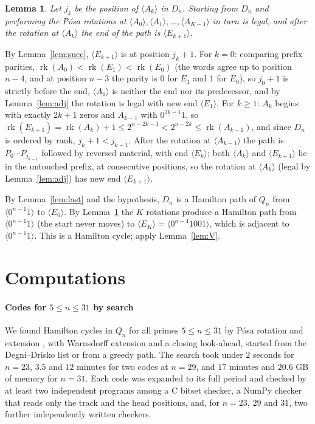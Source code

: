 \documentclass[journal,onecolumn,11pt]{IEEEtran}
\newtheorem{lemma}{Lemma}
\newcommand{\rk}{\operatorname{rk}}
\begin{document}
\begin{lemma}\label{lem:legal}
Let $j_k$ be the position of $\langle A_k\rangle$ in $D_n$. Starting from $D_n$ and performing the P\'osa rotations at
$\langle A_0\rangle,\langle A_1\rangle,\dots,\langle A_{K-1}\rangle$ in turn is legal, and after the rotation at
$\langle A_k\rangle$ the end of the path is $\langle E_{k+1}\rangle$.
\end{lemma}
\begin{IEEEproof}
By Lemma~\ref{lem:succ}, $\langle E_{k+1}\rangle$ is at position $j_k+1$. For $k=0$: comparing prefix parities,
$\rk(A_0)<\rk(E_1)<\rk(E_0)$ (the words agree up to position $n-4$, and at position $n-3$ the parity is $0$ for
$E_1$ and $1$ for $E_0$), so $j_0+1$ is strictly before the end, $\langle A_0\rangle$ is neither the end nor its
predecessor, and by Lemma~\ref{lem:adj} the rotation is legal with new end $\langle E_1\rangle$. For $k\ge1$:
$A_k$ begins with exactly $2k+1$ zeros and $A_{k-1}$ with $0^{2k-1}1$, so
$\rk(E_{k+1})=\rk(A_k)+1\le 2^{n-2k-1}<2^{n-2k}\le\rk(A_{k-1})$, and since $D_n$ is ordered by rank,
$j_k+1<j_{k-1}$. After the rotation at $\langle A_{k-1}\rangle$ the path is $P_0\cdots P_{j_{k-1}}$ followed by
reversed material, with end $\langle E_k\rangle$; both $\langle A_k\rangle$ and $\langle E_{k+1}\rangle$ lie in the
untouched prefix, at consecutive positions, so the rotation at $\langle A_k\rangle$ (legal by
Lemma~\ref{lem:adj}) has new end $\langle E_{k+1}\rangle$.
\end{IEEEproof}

\begin{IEEEproof}
By Lemma~\ref{lem:last} and the hypothesis, $D_n$ is a Hamilton path of $Q_n$ from $\langle0^{n-1}1\rangle$ to
$\langle E_0\rangle$. By Lemma~\ref{lem:legal} the $K$ rotations produce a Hamilton path from
$\langle0^{n-1}1\rangle$ (the start never moves) to $\langle E_K\rangle=\langle0^{n-4}1001\rangle$, which is adjacent
to $\langle0^{n-1}1\rangle$. This is a Hamilton cycle; apply Lemma~\ref{lem:V}.
\end{IEEEproof}

\section{Computations}\label{sec:comp}

\paragraph{Codes for $5\le n\le31$ by search} We found Hamilton cycles in $Q_n$ for all primes $5\le n\le 31$ by
P\'osa rotation and extension \cite{Pos76}, with Warnsdorff extension and a closing look-ahead, started from the
Degni--Drisko list or from a greedy path. The search took under $2$ seconds for $n=23$, $3.5$ and $12$ minutes for two codes at $n=29$, and
$17$ minutes and $20.6$ GB of memory for $n=31$. Each code was expanded to its full period and checked by at least
two independent programs among a C bitset checker, a NumPy checker that reads only the track and the head positions,
and, for $n=23$, $29$ and $31$, two further independently written checkers.
\end{document}
